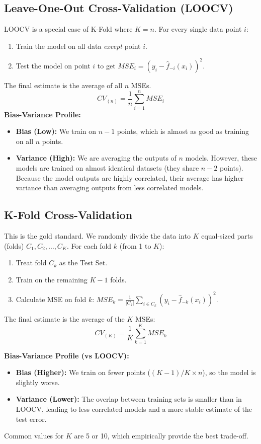 \documentclass[11pt, a4paper]{article}
\begin{document}
\subsection{Leave-One-Out Cross-Validation (LOOCV)}
LOOCV is a special case of K-Fold where $K=n$. For every single data point $i$:
\begin{enumerate}
    \item Train the model on all data \textit{except} point $i$.
    \item Test the model on point $i$ to get $MSE_i = (y_i - \hat{f}_{-i}(x_i))^2$.
\end{enumerate}
The final estimate is the average of all $n$ MSEs.
\[ CV_{(n)} = \frac{1}{n} \sum_{i=1}^n MSE_i \]
\textbf{Bias-Variance Profile:}
\begin{itemize}
    \item \textbf{Bias (Low):} We train on $n-1$ points, which is almost as good as training on all $n$ points.
    \item \textbf{Variance (High):} We are averaging the outputs of $n$ models. However, these models are trained on almost identical datasets (they share $n-2$ points). Because the model outputs are highly correlated, their average has higher variance than averaging outputs from less correlated models.
\end{itemize}

\subsection{K-Fold Cross-Validation}
This is the gold standard. We randomly divide the data into $K$ equal-sized parts (folds) $C_1, C_2, \dots, C_K$. For each fold $k$ (from 1 to $K$):
\begin{enumerate}
    \item Treat fold $C_k$ as the Test Set.
    \item Train on the remaining $K-1$ folds.
    \item Calculate MSE on fold $k$: $MSE_k = \frac{1}{|C_k|} \sum_{i \in C_k} (y_i - \hat{f}_{-k}(x_i))^2$.
\end{enumerate}
The final estimate is the average of the $K$ MSEs:
\[ CV_{(K)} = \frac{1}{K} \sum_{k=1}^K MSE_k \]

\textbf{Bias-Variance Profile (vs LOOCV):}
\begin{itemize}
    \item \textbf{Bias (Higher):} We train on fewer points ($(K-1)/K \times n$), so the model is slightly worse.
    \item \textbf{Variance (Lower):} The overlap between training sets is smaller than in LOOCV, leading to less correlated models and a more stable estimate of the test error.
\end{itemize}
Common values for $K$ are 5 or 10, which empirically provide the best trade-off.
\end{document}
